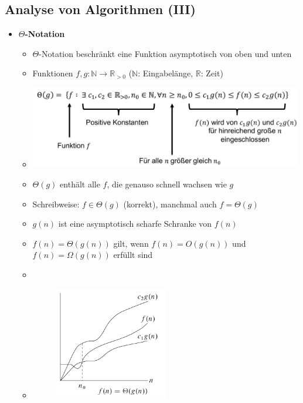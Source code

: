 \documentclass[
    12pt,
    a4paper,
    ngerman,
    color=3b,%
    marginpar=false,
    colorback=false,
    leqno,
]{tudaexercise}
\begin{document}
\subsection{Analyse von Algorithmen \textmd{(III)}}\label{Analyse von Algorithmen 3}
\begin{itemize}
    \item \textbf{$\Theta$-Notation}
          \begin{itemize}
              \item $\Theta$-Notation beschränkt eine Funktion asymptotisch von oben und unten
              \item Funktionen $f,g: \mathbb{N} \rightarrow \mathbb{R}_{>0}$ ($\mathbb{N}$: Eingabelänge, $\mathbb{R}$: Zeit)
              \item[] \includegraphics[width=12cm]{pictures/thetaNotation.pdf}
              \item $\Theta(g)$ enthält alle $f$, die genauso schnell wachsen wie $g$
              \item Schreibweise: $f \in \Theta(g)$ (korrekt), manchmal auch $f = \Theta(g)$
              \item $g(n)$ ist eine asymptotisch scharfe Schranke von $f(n)$
              \item $f(n)= \Theta(g(n))$ gilt, wenn $f(n) = O(g(n))$ und $f(n)=\Omega(g(n))$ erfüllt sind
              \item[]
              \item[]
                    \begin{minipage}{0.3\textwidth}
                        \begin{figure}[H]
                            \centering
                            \includegraphics[width=5cm]{pictures/thetaNotationGraph.pdf}

\end{figure}
\end{minipage}
\end{itemize}
\end{itemize}
\end{document}
